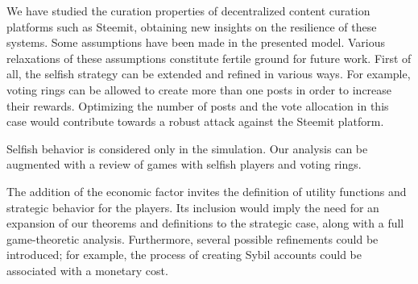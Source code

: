 \documentclass[a4paper,english,cleveref, autoref]{oasics-v2019}
\begin{document}
  We have studied the curation properties of decentralized content curation
  platforms such as Steemit, obtaining new insights on the resilience of these
  systems. Some assumptions have been made in the presented model. Various
  relaxations of these assumptions constitute fertile ground for future work.
  First of all, the selfish strategy can be extended and refined in various
  ways. For example, voting rings can be allowed to create more than one posts
  in order to increase their rewards. Optimizing the number of posts and the
  vote allocation in this case would contribute towards a robust attack against
  the Steemit platform.

  Selfish behavior is considered only in the simulation. Our analysis can be
  augmented with a review of games with selfish players and voting rings.

  The addition of the economic factor invites the definition of utility
  functions and strategic behavior for the players. Its inclusion would imply
  the need for an expansion of our theorems and definitions to the strategic
  case, along with a full game-theoretic analysis. Furthermore, several possible
  refinements could be introduced; for example, the process of creating Sybil
  accounts could be associated with a monetary cost.
\end{document}
